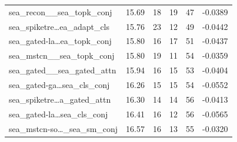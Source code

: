 \begin{table}[t]
\begin{tabular}{lrrrrr}
sea\_recon\_\_sea\_topk\_conj & 15.69 & 18 & 19 & 47 & -0.0389 \\
sea\_spiketre\dots{}ea\_adapt\_cls & 15.76 & 23 & 12 & 49 & -0.0442 \\
sea\_gated-la\dots{}ea\_topk\_conj & 15.80 & 16 & 17 & 51 & -0.0437 \\
sea\_mstcn\_\_sea\_topk\_conj & 15.80 & 19 & 11 & 54 & -0.0359 \\
sea\_gated\_\_sea\_gated\_attn & 15.94 & 16 & 15 & 53 & -0.0404 \\
sea\_gated-ga\dots{}sea\_cls\_conj & 16.26 & 15 & 15 & 54 & -0.0552 \\
sea\_spiketre\dots{}a\_gated\_attn & 16.30 & 14 & 14 & 56 & -0.0413 \\
sea\_gated-la\dots{}sea\_cls\_conj & 16.41 & 16 & 12 & 56 & -0.0565 \\
sea\_mstcn-so\dots{}\_sea\_sm\_conj & 16.57 & 16 & 13 & 55 & -0.0320 \\
\bottomrule
\end{tabular}
\end{table}
